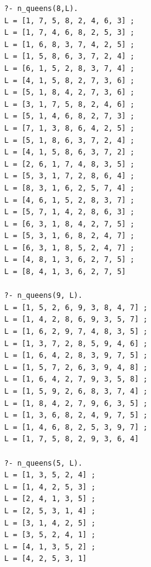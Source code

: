 \documentclass{article}
\begin{document}
	\begin{verbatim}
?- n_queens(8,L).
L = [1, 7, 5, 8, 2, 4, 6, 3] ;
L = [1, 7, 4, 6, 8, 2, 5, 3] ;
L = [1, 6, 8, 3, 7, 4, 2, 5] ;
L = [1, 5, 8, 6, 3, 7, 2, 4] ;
L = [6, 1, 5, 2, 8, 3, 7, 4] ;
L = [4, 1, 5, 8, 2, 7, 3, 6] ;
L = [5, 1, 8, 4, 2, 7, 3, 6] ;
L = [3, 1, 7, 5, 8, 2, 4, 6] ;
L = [5, 1, 4, 6, 8, 2, 7, 3] ;
L = [7, 1, 3, 8, 6, 4, 2, 5] ;
L = [5, 1, 8, 6, 3, 7, 2, 4] ;
L = [4, 1, 5, 8, 6, 3, 7, 2] ;
L = [2, 6, 1, 7, 4, 8, 3, 5] ;
L = [5, 3, 1, 7, 2, 8, 6, 4] ;
L = [8, 3, 1, 6, 2, 5, 7, 4] ;
L = [4, 6, 1, 5, 2, 8, 3, 7] ;
L = [5, 7, 1, 4, 2, 8, 6, 3] ;
L = [6, 3, 1, 8, 4, 2, 7, 5] ;
L = [5, 3, 1, 6, 8, 2, 4, 7] ;
L = [6, 3, 1, 8, 5, 2, 4, 7] ;
L = [4, 8, 1, 3, 6, 2, 7, 5] ;
L = [8, 4, 1, 3, 6, 2, 7, 5] 

?- n_queens(9, L).
L = [1, 5, 2, 6, 9, 3, 8, 4, 7] ;
L = [1, 4, 2, 8, 6, 9, 3, 5, 7] ;
L = [1, 6, 2, 9, 7, 4, 8, 3, 5] ;
L = [1, 3, 7, 2, 8, 5, 9, 4, 6] ;
L = [1, 6, 4, 2, 8, 3, 9, 7, 5] ;
L = [1, 5, 7, 2, 6, 3, 9, 4, 8] ;
L = [1, 6, 4, 2, 7, 9, 3, 5, 8] ;
L = [1, 5, 9, 2, 6, 8, 3, 7, 4] ;
L = [1, 8, 4, 2, 7, 9, 6, 3, 5] ;
L = [1, 3, 6, 8, 2, 4, 9, 7, 5] ;
L = [1, 4, 6, 8, 2, 5, 3, 9, 7] ;
L = [1, 7, 5, 8, 2, 9, 3, 6, 4]

?- n_queens(5, L).
L = [1, 3, 5, 2, 4] ;
L = [1, 4, 2, 5, 3] ;
L = [2, 4, 1, 3, 5] ;
L = [2, 5, 3, 1, 4] ;
L = [3, 1, 4, 2, 5] ;
L = [3, 5, 2, 4, 1] ;
L = [4, 1, 3, 5, 2] ;
L = [4, 2, 5, 3, 1]

	\end{verbatim}
		
\end{document}
